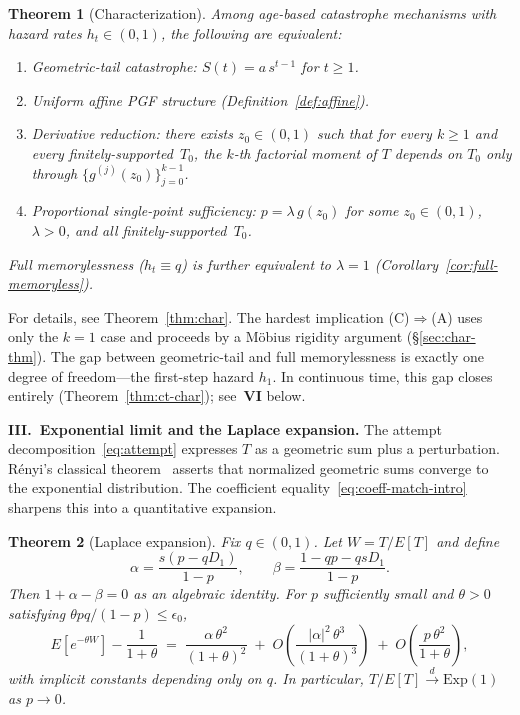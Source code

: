 \documentclass[11pt]{article}
\theoremstyle{plain}
\newtheorem{theorem}{Theorem}[section]
\theoremstyle{definition}
\theoremstyle{remark}
\begin{document}
\begin{theorem}[Characterization]\label{thm:B}
Among age-based catastrophe mechanisms with hazard rates $h_t \in (0,1)$, the following are equivalent:
\begin{enumerate}[\rm (A)]
\item Geometric-tail catastrophe: $S(t) = a\,s^{t-1}$ for $t \geq 1$.
\item Uniform affine PGF structure (Definition~\ref{def:affine}).
\item Derivative reduction: there exists $z_0 \in (0,1)$ such that for every $k \geq 1$ and every finitely-supported~$T_0$, the $k$-th factorial moment of $T$ depends on $T_0$ only through $\{g^{(j)}(z_0)\}_{j=0}^{k-1}$.
\item Proportional single-point sufficiency: $p = \lambda\, g(z_0)$ for some $z_0 \in (0,1)$, $\lambda > 0$, and all finitely-supported~$T_0$.
\end{enumerate}
Full memorylessness ($h_t \equiv q$) is further equivalent to $\lambda = 1$ (Corollary~\ref{cor:full-memoryless}).
\end{theorem}

For details, see Theorem~\ref{thm:char}. The hardest implication (C)$\Rightarrow$(A) uses only the $k=1$ case and proceeds by a M\"obius rigidity argument (\S\ref{sec:char-thm}).  The gap between geometric-tail and full memorylessness is exactly one degree of freedom---the first-step hazard $h_1$.  In continuous time, this gap closes entirely (Theorem~\ref{thm:ct-char}); see~\textbf{VI} below.

\medskip
\noindent\textbf{III.\ Exponential limit and the Laplace expansion.}
The attempt decomposition~\eqref{eq:attempt} expresses $T$ as a geometric sum plus a perturbation.  R\'enyi's classical theorem~\cite{Renyi56} asserts that normalized geometric sums converge to the exponential distribution.  The coefficient equality~\eqref{eq:coeff-match-intro} sharpens this into a quantitative expansion.

\begin{theorem}[Laplace expansion]\label{thm:C}
Fix $q \in (0,1)$.  Let $W = T/E[T]$ and define
\[
  \alpha = \frac{s(p - qD_1)}{1-p}, \qquad \beta = \frac{1 - qp - qsD_1}{1-p}.
\]
Then $1 + \alpha - \beta = 0$ as an algebraic identity.  For $p$ sufficiently small and $\theta > 0$ satisfying $\theta p q / (1-p) \leq \epsilon_0$,
\[
  E[e^{-\theta W}] - \frac{1}{1+\theta}
  \;=\;
  \frac{\alpha\,\theta^2}{(1+\theta)^2}
  \;+\; O\!\left(\frac{|\alpha|^2\,\theta^3}{(1+\theta)^3}\right)
  \;+\; O\!\left(\frac{p\,\theta^2}{1+\theta}\right),
\]
with implicit constants depending only on $q$.  In particular, $T/E[T] \xrightarrow{d} \mathrm{Exp}(1)$ as $p \to 0$.
\end{theorem}
\end{document}
